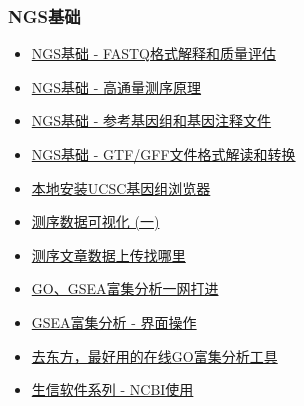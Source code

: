 \documentclass[]{article}
\providecommand{\tightlist}{%
  \setlength{\itemsep}{0pt}\setlength{\parskip}{0pt}}
\numberwithin{figure}{section}
\numberwithin{table}{section}
\begin{document}
\hypertarget{ngsux57faux7840}{%
\subsubsection{NGS基础}\label{ngsux57faux7840}}

\begin{itemize}
\tightlist
\item
  \href{http://mp.weixin.qq.com/s?__biz=MzI5MTcwNjA4NQ==\&mid=2247484047\&idx=1\&sn=3e2a79d9f56040a57ac2e16cf1923b54\&chksm=ec0dc705db7a4e133e6e91de9ac11a6c0690f03d7b3b760b358e9b0d1a2d57974599419d9fff\#rd}{NGS基础 - FASTQ格式解释和质量评估}
\item
  \href{http://mp.weixin.qq.com/s?__biz=MzI5MTcwNjA4NQ==\&mid=2247484034\&idx=1\&sn=e7680ee935f8603214227b37eeb2c567\&chksm=ec0dc708db7a4e1eca4e38845381f328c49c84a90ad6580c3ba3761511772636e5ec0f185931\#rd}{NGS基础 - 高通量测序原理}
\item
  \href{http://mp.weixin.qq.com/s?__biz=MzI5MTcwNjA4NQ==\&mid=2247484148\&idx=1\&sn=525233898721a9c3ebdf275babf14944\&chksm=ec0dc77edb7a4e686440e0cbe5fbf39f554c4183dc30e7870ab7584e285f4e018dd94b680f79\#rd}{NGS基础 - 参考基因组和基因注释文件}
\item
  \href{http://mp.weixin.qq.com/s?__biz=MzI5MTcwNjA4NQ==\&mid=2247484166\&idx=1\&sn=417e155672bd718def86003b16bf0078\&chksm=ec0dc68cdb7a4f9a6bcb62c18797a69040173e2b0af20f1cf87d3e0d75e3adee03c7ff524dc5\#rd}{NGS基础 - GTF/GFF文件格式解读和转换}
\item
  \href{http://mp.weixin.qq.com/s?__biz=MzI5MTcwNjA4NQ==\&mid=2247484167\&idx=1\&sn=ef9699899164d23013d92b61331c6562\&chksm=ec0dc68ddb7a4f9bfb83b9942196622f8b8f52b041d3f4a12786e6464752fbeaf64c9a640e39\#rd}{本地安装UCSC基因组浏览器}
\item
  \href{http://mp.weixin.qq.com/s?__biz=MzI5MTcwNjA4NQ==\&mid=2247483946\&idx=1\&sn=3f95769229f28a91ed8bf5889e2181be\&chksm=ec0dc7a0db7a4eb64d08c7799cfe698a1662e6d0d935a8b91c6c969aae86900df4decc469a0d\#rd}{测序数据可视化 (一)}
\item
  \href{http://mp.weixin.qq.com/s?__biz=MzI5MTcwNjA4NQ==\&mid=2247483843\&idx=1\&sn=43770d21f6c2da2393c31cd55fdbe31e\&chksm=ec0dc449db7a4d5f723842286bf7feab7830eba5d9778d351569810a069e5ace76040f94a6bd\#rd}{测序文章数据上传找哪里}
\item
  \href{http://mp.weixin.qq.com/s/d1KCETQZ88yaOLGwAtpWYg}{GO、GSEA富集分析一网打进}
\item
  \href{http://mp.weixin.qq.com/s/3Nd3urhfRGkw-F0LGZrlZQ}{GSEA富集分析 - 界面操作}
\item
  \href{https://mp.weixin.qq.com/s/l6j2encDfEQkt2UeNCMFhg}{去东方，最好用的在线GO富集分析工具}
\item
  \href{http://mp.weixin.qq.com/s/4a5U8GdBoNFXkykL6m2EeA}{生信软件系列 - NCBI使用}
\end{itemize}
\end{document}
